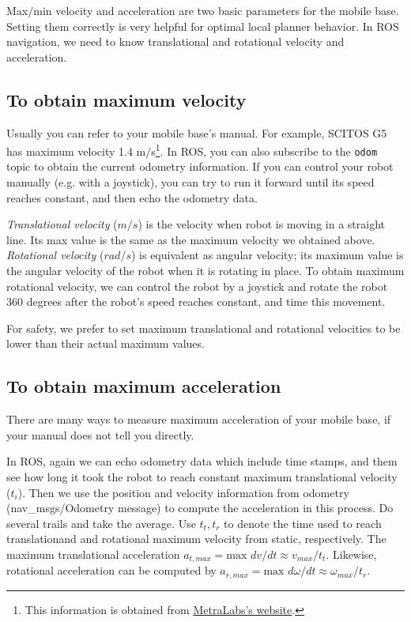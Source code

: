 \documentclass[12pt]{article}
\begin{document}
\noindent Max$/$min velocity and acceleration are two basic parameters for the mobile base. Setting them correctly is very helpful for optimal local planner behavior. In ROS navigation, we need to know translational and rotational velocity and acceleration.

\subsection{To obtain maximum velocity}
Usually you can refer to your mobile base's manual. For example, SCITOS G5 has maximum velocity 1.4 m$/$s\footnote{This information is obtained from \href{http://www.metralabs.com/en/research}{MetraLabs's website}.}. In ROS, you can also subscribe to the \texttt{odom} topic to obtain the current odometry information. If you can control your robot manually (e.g. with a joystick), you can try to run it forward until its
speed reaches constant, and then echo the odometry data.

\textit{Translational velocity} ($m/s$) is the velocity when robot is moving in a straight line. Its max value is the same as the maximum velocity we obtained above. \textit{Rotational velocity} ($rad/s$) is equivalent as angular velocity; its maximum value is the angular velocity of the robot when it is rotating in place. To obtain maximum rotational velocity, we can control the robot by a joystick and rotate the robot 360 degrees after the robot's speed reaches constant, and time this movement. %

For safety, we prefer to set maximum translational and rotational velocities to be lower than their actual maximum values.

\subsection{To obtain maximum acceleration}
There are many ways to measure maximum acceleration of your mobile base, if your manual does not tell you directly. 

In ROS, again we can echo odometry data which include time stamps, and them see how long it took the robot to reach constant maximum translational velocity ($t_{i}$). Then we use the position and velocity information from odometry (nav\_msgs/Odometry message) to compute the acceleration in this process. Do several trails and take the average. Use $t_t, t_r$ to denote the time used to reach translationand and rotational maximum velocity from static, respectively. The maximum translational acceleration $a_{t,max}=\text{max }dv / dt\approx v_{max}/t_t$. Likewise, rotational acceleration can be computed by $a_{r,max}=\text{max }d\omega / dt\approx \omega_{max}/t_r$.
\end{document}

